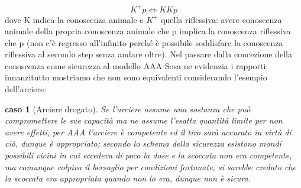 \documentclass[10pt,a4paper]{article}
\newtheorem{caso}{caso}
\begin{document}
\[K^+p \Leftrightarrow KKp\] 
dove K indica la conoscenza animale e \(K^+\) quella riflessiva: avere conoscenza animale della propria conoscenza animale che p implica la conoscenza riflessiva che p (non c'è regresso all'infinito perché è possibile soddisfare la conoscenza riflessiva al secondo step senza andare oltre). Nel passare dalla concezione della conoscenza come sicurezza al modello AAA Sosa ne evidenzia i rapporti: innanzitutto mostriamo che non sono equivalenti considerando l'esempio dell'arciere: 
\begin{caso}[Arciere drogato]
	Se l'arciere assume una sostanza che può compromettere le sue capacità ma ne assume l'esatta quantità limite per non avere effetti, per AAA l'arciere è competente ed il tiro sarà accurato in virtù di ciò, dunque è appropriato; secondo lo schema della sicurezza esistono mondi possibili vicini in cui eccedeva di poco la dose e la scoccata non era competente, ma comunque colpiva il bersaglio per condizioni fortunate, si sarebbe creduto che la scoccata era appropriata quando non lo era, dunque non è sicura.
\end{caso}
\end{document}
